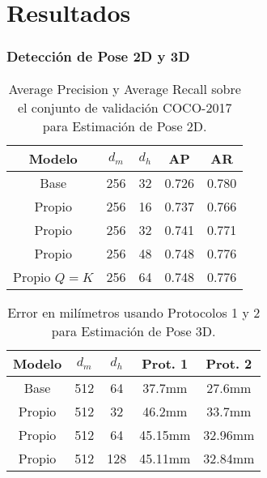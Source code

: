 \documentclass{beamer}
\begin{document}
\section{Resultados}

\begin{frame}
\frametitle{Detección de Pose 2D y 3D}

\tiny

\begin{table}
    \begin{center}
    \begin{tabular}{| c | c | c | c | c |}
        \hline
        \textbf{Modelo} & \textbf{$d_m$} & \textbf{$d_h$} & \textbf{AP} & \textbf{AR} \\
        \hline
        \hline
        Base & 256 & 32 & 0.726 & 0.780 \\
        \hline
        \hline
        Propio & 256 & 16 & 0.737 & 0.766 \\
        \hline
        Propio & 256 & 32 & 0.741 & 0.771 \\
        \hline
        Propio & 256 & 48 & 0.748 & 0.776 \\
        \hline
        \hline
        Propio $Q=K$ & 256 & 64 & 0.748 & 0.776 \\
        \hline
    \end{tabular}
    \end{center}
\caption{Average Precision y Average Recall sobre el conjunto de validación COCO-2017 para
         Estimación de Pose 2D.}
\label{table:2d}
\end{table}

\begin{table}
    \begin{center}
    \begin{tabular}{| c | c | c | c | c |}
        \hline
        \textbf{Modelo} & \textbf{$d_m$} & \textbf{$d_h$} & \textbf{Prot. 1} & \textbf{Prot. 2} \\
        \hline
        \hline
        Base & 512 & 64 & 37.7mm & 27.6mm \\
        \hline
        \hline
        Propio & 512 & 32 & 46.2mm & 33.7mm \\
        \hline
        Propio & 512 & 64 & 45.15mm & 32.96mm \\
        \hline
        Propio & 512 & 128 & 45.11mm & 32.84mm \\
        \hline
    \end{tabular}
    \end{center}
\caption{Error en milímetros usando Protocolos 1 y 2 para Estimación de Pose 3D.}
\label{table:3d}
\end{table}

\end{frame}
\end{document}
